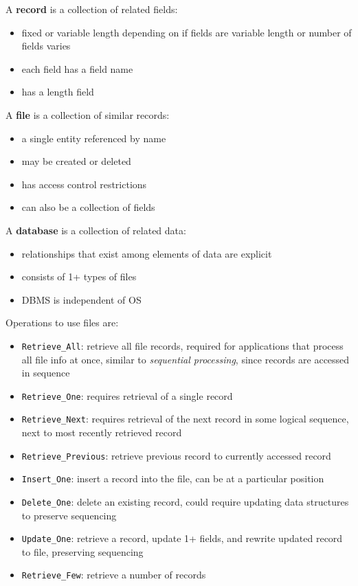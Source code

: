\documentclass[11pt]{article}
\begin{document}
A \textbf{record} is a collection of related fields:
\begin{itemize}
\item fixed or variable length depending on if fields are variable length or number of fields
varies
\item each field has a field name
\item has a length field
\end{itemize}

A \textbf{file} is a collection of similar records:
\begin{itemize}
\item a single entity referenced by name
\item may be created or deleted
\item has access control restrictions
\item can also be a collection of fields
\end{itemize}

A \textbf{database} is a collection of related data:
\begin{itemize}
\item relationships that exist among elements of data are explicit
\item consists of 1+ types of files
\item DBMS is independent of OS
\end{itemize}

Operations to use files are:
\begin{itemize}
\item \texttt{Retrieve\_All}: retrieve all file records, required for applications that process all
file info at once, similar to \emph{sequential processing}, since records are accessed in
sequence
\item \texttt{Retrieve\_One}: requires retrieval of a single record
\item \texttt{Retrieve\_Next}: requires retrieval of the next record in some logical sequence, next to
most recently retrieved record
\item \texttt{Retrieve\_Previous}: retrieve previous record to currently accessed record
\item \texttt{Insert\_One}: insert a record into the file, can be at a particular position
\item \texttt{Delete\_One}: delete an existing record, could require updating data structures to preserve
sequencing
\item \texttt{Update\_One}: retrieve a record, update 1+ fields, and rewrite updated record to file,
preserving sequencing
\item \texttt{Retrieve\_Few}: retrieve a number of records
\end{itemize}
\end{document}
